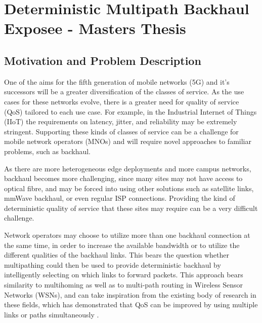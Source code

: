 
\cleardoublepage
\chapter{Deterministic Multipath Backhaul Exposee - Masters Thesis}

\label{cha:introduction}

\section{Motivation and Problem Description}
\label{sec:motivation}

One of the aims for the fifth generation of mobile networks (5G) and it's successors will be a greater diversification of the classes of service. As the use cases for these networks evolve, there is a greater need for quality of service (QoS) tailored to each use case. For example, in the Industrial Internet of Things (IIoT) the requirements on latency, jitter, and reliability may be extremely stringent. Supporting these kinds of classes of service can be a challenge for mobile network operators (MNOs) and will require novel approaches to familiar problems, such as backhaul.

As there are more heterogeneous edge deployments and more campus networks, backhaul becomes more challenging, since many sites may not have access to optical fibre, and may be forced into using other solutions such as satellite links, mmWave backhaul, or even regular ISP connections. Providing the kind of deterministic quality of service that these sites may require can be a very difficult challenge.

Network operators may choose to utilize more than one backhaul connection at the same time, in order to increase the available bandwidth or to utilize the different qualities of the backhaul links. This bears the question whether multipathing could then be used to provide deterministic backhaul by intelligently selecting on which links to forward packets. This approach bears similarity to multihoming as well as to multi-path routing in Wireless Sensor Networks (WSNs), and can take inspiration from the existing body of research in these fields, which has demonstrated that QoS can be improved by using multiple links or paths simultaneously \cite{akella2003measurement, tao2005improving, habib2007improving, goldenberg2004optimizing, huang2008multiconstrained, akella2008performance}.


